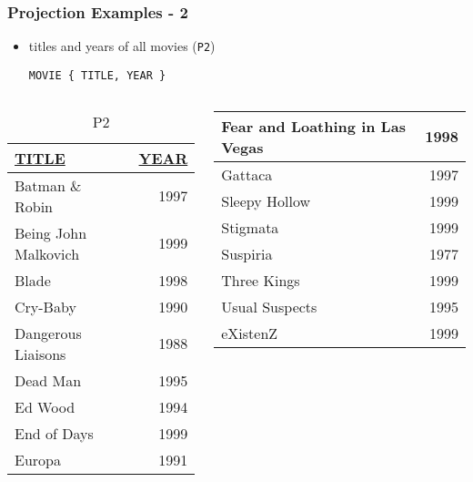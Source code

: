 \documentclass[dvipsnames]{beamer}
\theoremstyle{plain}
\begin{document}
\begin{frame}[fragile]
  \frametitle{Projection Examples - 2}

  \begin{itemize}
    \item titles and years of all movies (\texttt{P2})
    \begin{lstlisting}
MOVIE { TITLE, YEAR }
    \end{lstlisting}
  \end{itemize}

  \vspace{-10pt}
  \begin{columns}[b]
    \begin{tiny}
    \begin{table}
      \caption{P2}
      \begin{tabular}{|l|r|}\hline
\underline{TITLE}              & \underline{YEAR}\\[2pt]\hline\hline
Batman \& Robin                & 1997\\\hline
Being John Malkovich           & 1999\\\hline
Blade                          & 1998\\\hline
Cry-Baby                       & 1990\\\hline
Dangerous Liaisons             & 1988\\\hline
Dead Man                       & 1995\\\hline
Ed Wood                        & 1994\\\hline
End of Days                    & 1999\\\hline
Europa                         & 1991\\\hline
      \end{tabular}
    \end{table}
    \end{tiny}

    \begin{tiny}
    \begin{table}
      \begin{tabular}{|l|r|}\hline
Fear and Loathing in Las Vegas & 1998\\\hline
Gattaca                        & 1997\\\hline
Sleepy Hollow                  & 1999\\\hline
Stigmata                       & 1999\\\hline
Suspiria                       & 1977\\\hline
Three Kings                    & 1999\\\hline
Usual Suspects                 & 1995\\\hline
eXistenZ                       & 1999\\\hline
      \end{tabular}
    \end{table}
    \end{tiny}
  \end{columns}
\end{frame}
\end{document}
